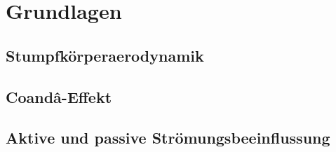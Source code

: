 \chapter{Grundlagen}\label{s:grundlagen}

\section{Stumpfk\"orperaerodynamik}

\section{Coand\^{a}-Effekt}

\section{Aktive und passive Str\"omungsbeeinflussung}

